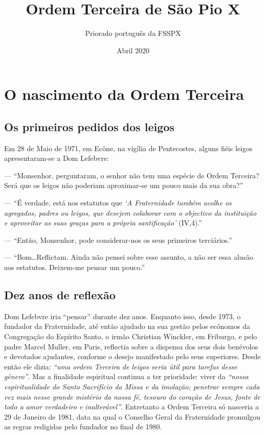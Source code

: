 \documentclass[11pt]{article}
\title{Ordem Terceira de São Pio X}
\author{Priorado português da FSSPX}
\date{Abril 2020}
\begin{document}
\begin{titlepage}
\maketitle
\end{titlepage}

\section{O nascimento da Ordem Terceira}\label{sec:o-nascimento-da-ordem-terceira}

\subsection{Os primeiros pedidos dos leigos}\label{subsec:os-primeiros-pedidos-dos-leigos}

Em 28 de Maio de 1971, em Ecône, na vigília de Pentecostes, alguns fiéis leigos apresentaram-se a Dom Lefebvre:

--- ``Monsenhor, perguntaram, o senhor não tem uma espécie de Ordem Terceira?
Será que os leigos não poderiam aproximar-se um pouco mais da sua obra?''

--- ``É verdade, está nos estatutos que \textit{`A Fraternidade também acolhe os agregados, padres ou leigos, que desejem colaborar com o objectivo da instituição e aproveitar as suas graças para a própria santificação'} (IV,4).''

--- ``Então, Monsenhor, pode considerar-nos os seus primeiros terciários.''

--- ``Bom\ldots Reflictam.
Ainda não pensei sobre esse assunto, a não ser essa alusão aos estatutos.
Deixem-me pensar um pouco.''

\subsection{Dez anos de reflexão}\label{subsec:dez-anos-de-reflexão}

Dom Lefebvre iria ``pensar'' durante dez anos.
Enquanto isso, desde 1973, o fundador da Fraternidade, até então ajudado na sua gestão pelos ecónomos da Congregação do Espírito Santo, o irmão Christian Winckler, em Friburgo, e pelo padre Marcel Muller, em Paris, reflectia sobre a dispensa dos seus dois benévolos e devotados ajudantes, conforme o desejo manifestado pelo seus superiores.
Desde então ele dizia: \textit{``uma ordem Terceira de leigos seria útil para tarefas desse género''}.
Mas a finalidade espiritual continua a ter prioridade: viver da \textit{``nossa espiritualidade do Santo Sacrifício da Missa e da imolação;
penetrar sempre cada vez mais nesse grande mistério da nossa fé, tesouro do coração de Jesus, fonte de todo a amor verdadeiro e inalterável''}.
Entretanto a Ordem Terceira só nasceria a 29 de Janeiro de 1981, data na qual o Conselho Geral da Fraternidade promulgou as regras redigidas pelo fundador no final de 1980.
\end{document}
